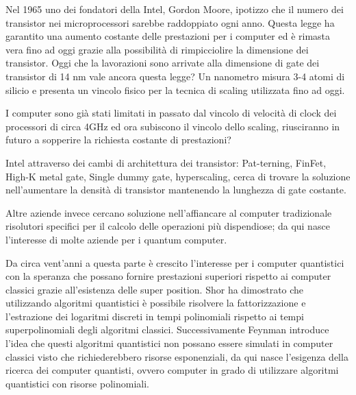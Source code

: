 Nel 1965 uno dei fondatori della Intel, Gordon Moore, ipotizzo che il numero dei transistor nei microprocessori sarebbe raddoppiato ogni anno. Questa legge ha garantito una aumento costante delle prestazioni per i computer ed è rimasta vera fino ad oggi grazie alla possibilità di rimpicciolire la dimensione dei transistor. Oggi che la lavorazioni sono arrivate alla dimensione di gate dei transistor di 14 nm vale ancora questa legge? Un nanometro misura 3-4 atomi di silicio e presenta un vincolo fisico per la tecnica di scaling utilizzata fino ad oggi.

I computer sono già stati limitati in passato dal vincolo di velocità di clock dei processori di circa 4GHz ed ora subiscono il vincolo dello scaling, riusciranno in futuro a sopperire la richiesta costante di prestazioni?

Intel attraverso dei cambi di architettura dei transistor: Pat-terning, FinFet, High-K metal gate, Single dummy gate, hyperscaling, cerca di trovare la soluzione nell'aumentare la densità di transistor mantenendo la lunghezza di gate costante.

Altre aziende invece cercano soluzione nell'affiancare al computer tradizionale risolutori specifici per il calcolo delle operazioni più dispendiose; da qui nasce l'interesse di molte aziende per i quantum computer.

Da circa vent'anni a questa parte è crescito l'interesse per i computer quantistici con la speranza che possano fornire prestazioni superiori rispetto ai computer classici grazie all'esistenza delle super position. Shor ha dimostrato che utilizzando algoritmi quantistici è possibile risolvere la fattorizzazione e l'estrazione dei logaritmi discreti in tempi polinomiali rispetto ai tempi superpolinomiali degli algoritmi classici. Successivamente Feynman introduce l'idea che questi algoritmi quantistici non possano essere simulati in computer classici visto che richiederebbero risorse esponenziali, da qui nasce l'esigenza della ricerca dei computer quantisti, ovvero computer in grado di utilizzare algoritmi quantistici con risorse polinomiali.
